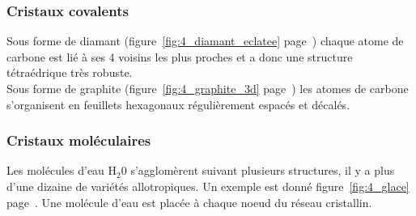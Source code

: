 \subsubsection*{Cristaux covalents}
\begin{ex}[Carbone]
    Sous forme de diamant (figure~\ref{fig:4_diamant_eclatee}
    page~\pageref{fig:4_diamant_eclatee}) chaque atome de
    carbone est lié à ses 4 voisins les plus proches et a donc une
    structure tétraédrique très robuste.\\
    Sous forme de graphite (figure~\ref{fig:4_graphite_3d}
    page~\pageref{fig:4_graphite_3d}) les atomes de
    carbone s'organisent en feuillets hexagonaux régulièrement
    espacés et décalés.
\end{ex}


\subsubsection*{Cristaux moléculaires}
\begin{ex}[Eau]
    Les molécules d'eau H$_2$0 s'agglomèrent suivant plusieurs structures,
    il y a plus d'une dizaine de variétés allotropiques. Un exemple
    est donné figure~\ref{fig:4_glace} page~\pageref{fig:4_glace}. Une molécule d'eau est placée
    à chaque noeud du réseau cristallin.
\end{ex}
